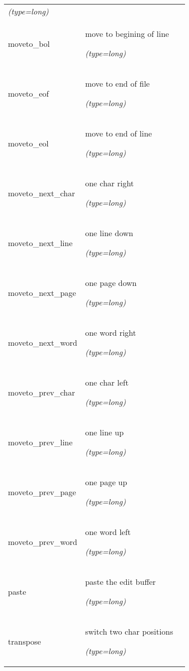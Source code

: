 \begin{longtable}{|p{\varnamewidth}|p{\vardescrwidth}|l}
            {\it (type=long)}&\\
\cline{1-2}
\raggedright m\-o\-v\-e\-t\-o\-\_\-b\-o\-l\- & \raggedright move to begining of line

            {\it (type=long)}&\\
\cline{1-2}
\raggedright m\-o\-v\-e\-t\-o\-\_\-e\-o\-f\- & \raggedright move to end of file

            {\it (type=long)}&\\
\cline{1-2}
\raggedright m\-o\-v\-e\-t\-o\-\_\-e\-o\-l\- & \raggedright move to end of line

            {\it (type=long)}&\\
\cline{1-2}
\raggedright m\-o\-v\-e\-t\-o\-\_\-n\-e\-x\-t\-\_\-c\-h\-a\-r\- & \raggedright one char right

            {\it (type=long)}&\\
\cline{1-2}
\raggedright m\-o\-v\-e\-t\-o\-\_\-n\-e\-x\-t\-\_\-l\-i\-n\-e\- & \raggedright one line down

            {\it (type=long)}&\\
\cline{1-2}
\raggedright m\-o\-v\-e\-t\-o\-\_\-n\-e\-x\-t\-\_\-p\-a\-g\-e\- & \raggedright one page down

            {\it (type=long)}&\\
\cline{1-2}
\raggedright m\-o\-v\-e\-t\-o\-\_\-n\-e\-x\-t\-\_\-w\-o\-r\-d\- & \raggedright one word right

            {\it (type=long)}&\\
\cline{1-2}
\raggedright m\-o\-v\-e\-t\-o\-\_\-p\-r\-e\-v\-\_\-c\-h\-a\-r\- & \raggedright one char left

            {\it (type=long)}&\\
\cline{1-2}
\raggedright m\-o\-v\-e\-t\-o\-\_\-p\-r\-e\-v\-\_\-l\-i\-n\-e\- & \raggedright one line up

            {\it (type=long)}&\\
\cline{1-2}
\raggedright m\-o\-v\-e\-t\-o\-\_\-p\-r\-e\-v\-\_\-p\-a\-g\-e\- & \raggedright one page up

            {\it (type=long)}&\\
\cline{1-2}
\raggedright m\-o\-v\-e\-t\-o\-\_\-p\-r\-e\-v\-\_\-w\-o\-r\-d\- & \raggedright one word left

            {\it (type=long)}&\\
\cline{1-2}
\raggedright p\-a\-s\-t\-e\- & \raggedright paste the edit buffer

            {\it (type=long)}&\\
\cline{1-2}
\raggedright t\-r\-a\-n\-s\-p\-o\-s\-e\- & \raggedright switch two char positions

            {\it (type=long)}&\\
\cline{1-2}
\end{longtable}

